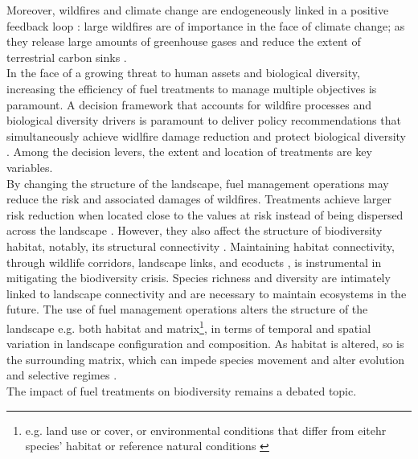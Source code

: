 %
Moreover, wildfires and climate change are endogeneously linked in a positive feedback loop : large wildfires are of importance in the face of climate change; as they release large amounts of greenhouse gases and reduce the extent of terrestrial carbon sinks \citep{zheng_record-high_2023, sweeney_estimating_2023}. \\
\hspace*{1.5em}In the face of a growing threat to human assets and biological diversity, increasing the efficiency of fuel treatments to manage multiple objectives is paramount. A decision framework that accounts for wildfire processes and biological diversity drivers is paramount to deliver policy recommendations that simultaneously achieve widlfire damage reduction and protect biological diversity \citep{driscoll_resolving_2010}. Among the decision levers, the extent and location of treatments are key variables. 
%
\\
By changing the structure of the landscape, fuel management operations may reduce the risk and associated damages of wildfires. Treatments achieve larger risk reduction when located close to the values at risk instead of being dispersed across the landscape \citep{ager_modeling_2007, Williams2017,Florec2020}. However, they also affect the structure of biodiversity habitat, notably, its structural connectivity \citep{Taylor93}. Maintaining habitat connectivity, through wildlife corridors, landscape links, and ecoducts \citep{Turner2005, Turner2011}, is instrumental in mitigating the biodiversity crisis. Species richness and diversity are intimately linked to landscape connectivity \citep{Olds2012, tian_assessing_2017, velazquez_structural_2019} and are necessary to maintain ecosystems in the future. 
The use of fuel management operations alters the structure of the landscape e.g. both habitat and matrix\footnote{e.g. land use or cover, or environmental conditions that differ from eitehr species' habitat or reference natural conditions \citep{fletcher_prominent_2024}}, in terms of temporal and spatial variation in landscape configuration and composition. As habitat is altered, so is the surrounding matrix, which can impede species movement \citep{eycott_meta-analysis_2012, kuefler_conflicting_2010} and alter evolution and selective regimes \citep{cheptou_adaptation_2017}.\\
The impact of fuel treatments on biodiversity remains a debated topic. 
